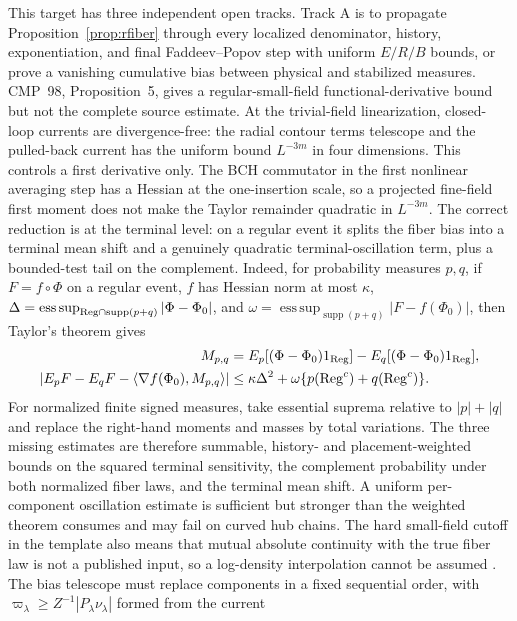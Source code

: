 \documentclass[11pt]{article}
\theoremstyle{definition}
\theoremstyle{remark}
\begin{document}
This target has three independent open tracks.  Track A is to propagate
Proposition~\ref{prop:rfiber} through every localized denominator, history,
exponentiation, and final Faddeev--Popov step with uniform $E/R/B$ bounds, or
prove a vanishing cumulative bias between physical and stabilized measures.
CMP~98, Proposition~5, gives a regular-small-field functional-derivative bound
but not the complete source estimate.  At the trivial-field linearization,
closed-loop currents are divergence-free: the radial contour terms telescope
and the pulled-back current has the uniform bound $L^{-3m}$ in four dimensions.
This controls a first derivative only.  The BCH commutator in the first
nonlinear averaging step has a Hessian at the one-insertion scale, so a
projected fine-field first moment does not make the Taylor remainder quadratic
in $L^{-3m}$.  The correct reduction is at the terminal level: on a regular
event it splits the fiber bias into a terminal mean shift and a genuinely
quadratic terminal-oscillation term, plus a bounded-test tail on the complement.
Indeed, for probability measures $p,q$, if $F=f\circ\Phi$ on a regular
event, $f$ has Hessian norm at most $\kappa$,
$\Delta=\operatorname*{ess\,sup}_{{\rm Reg}\cap\operatorname{supp}(p+q)}
|\Phi-\Phi_0|$, and
$\omega=\operatorname*{ess\,sup}_{\operatorname{supp}(p+q)}
|F-f(\Phi_0)|$, then Taylor's theorem gives
\[
 \begin{aligned}
 M_{p,q}&=E_p[(\Phi-\Phi_0)1_{\rm Reg}]
          -E_q[(\Phi-\Phi_0)1_{\rm Reg}],\\
 \left|E_pF-E_qF-
   \left\langle\nabla f(\Phi_0),M_{p,q}\right\rangle\right|
 &\le \kappa\Delta^2
   +\omega\{p({\rm Reg}^c)+q({\rm Reg}^c)\}.
\end{aligned}
\]
For normalized finite signed measures, take essential suprema relative to
$|p|+|q|$ and replace the right-hand moments and masses by total variations.
The three missing estimates are therefore summable, history- and
placement-weighted bounds on the squared terminal sensitivity, the complement
probability under both normalized fiber laws, and the terminal mean shift.  A
uniform per-component oscillation estimate is sufficient but stronger than the
weighted theorem consumes and may fail on curved hub chains.  The hard
small-field cutoff in the template also means that mutual
absolute continuity with the true fiber law is not a published input, so a
log-density interpolation cannot be assumed
\cite[Eqs.~(1.100)--(1.101)]{Balaban1989LargeI}.
The bias telescope must replace components in a fixed sequential order, with
$\varpi_\lambda\ge Z^{-1}|P_\lambda\nu_\lambda|$ formed from the current
\end{document}
